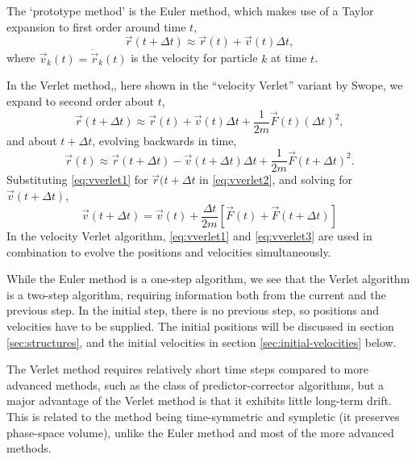 \documentclass[11pt,bibliography=totoc,index=totoc]{scrbook}   %
\begin{document}
The `prototype method' is the Euler method, which makes use of a Taylor expansion to first order around time $t$,
\begin{equation}
    \vec{r}(t+\Delta t) \approx \vec{r}(t) + \vec{v}(t) \Delta t,
\end{equation}
where $\vec{v}_k(t) = \dot{\vec{r}}_k(t)$ is the velocity for particle $k$ at time $t$. 

In the Verlet method,\cite{Verlet:1968b}, here shown in the ``velocity Verlet'' variant by Swope,\cite{Swope:1982}
we expand to second order about $t$,
\begin{equation}
    \vec{r}(t+\Delta t) \approx \vec{r}(t) + \vec{v}(t)\Delta t + \frac{1}{2m}\vec{F}(t)(\Delta t)^2,
  \label{eq:vverlet1}
\end{equation}
and about $t+\Delta t$, evolving backwards in time,
\begin{equation}
  \vec{r}(t) \approx \vec{r}(t+\Delta t) - \vec{v}(t+\Delta t)\Delta t + \frac{1}{2m}\vec{F}(t+\Delta t)^2.
  \label{eq:vverlet2}
\end{equation}
Substituting \ref{eq:vverlet1} for $\vec{r}(t+\Delta t$ in \ref{eq:vverlet2}, and solving for $\vec{v}(t+\Delta t)$,
\begin{equation}
    \vec{v}(t+\Delta t) = \vec{v}(t) + \frac{\Delta t}{2m} \left[ \vec{F}(t) + \vec{F}(t+\Delta t) \right]
  \label{eq:vverlet3}
\end{equation}
In the velocity Verlet algorithm, \eqref{eq:vverlet1} and \eqref{eq:vverlet3} are used in combination to 
evolve the positions and velocities simultaneously.

While the Euler method is a one-step algorithm, we see that the Verlet algorithm is a two-step algorithm, requiring information both from the current and the previous step.
In the initial step, there is no previous step, so positions and velocities have to be supplied. 
The initial positions will be discussed in section \ref{sec:structures}, and the initial velocities in section \ref{sec:initial-velocities} below.

The Verlet method requires relatively short time steps compared to more advanced methods, such as the class
of predictor-corrector algorithms,
but a major advantage of the Verlet method is that it exhibits little long-term drift.
This is related to the method being time-symmetric and sympletic (it preserves phase-space volume), 
unlike the Euler method and most of the more advanced methods.\cite[61-63]{Frenkel:1996}
\end{document}
